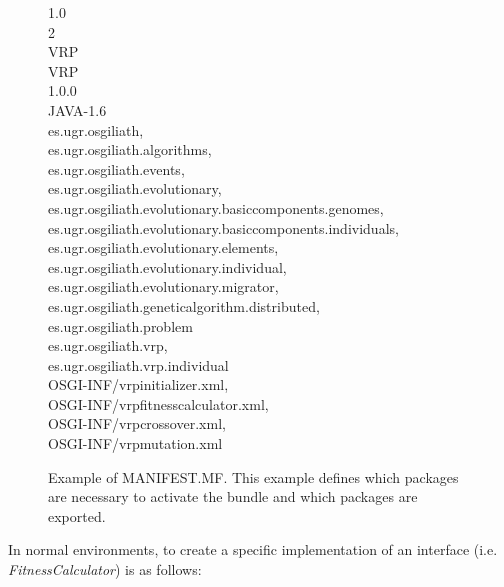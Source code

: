 \documentclass{sig-alternate}
\begin{document}
\begin{figure}[t]
\noindent
\ttfamily
{} 1.0\\
 2\\
 VRP\\
 VRP\\
 1.0.0\\
 JAVA-1.6\\
  es.ugr.osgiliath,\\
 \hlstd{}  es.ugr.osgiliath.algorithms,\\
\hlstd{} es.ugr.osgiliath.events,\\
 \hlstd{}es.ugr.osgiliath.evolutionary,\\
 \hlstd{}es.ugr.osgiliath.evolutionary.basiccomponents.genomes,\\
 \hlstd{}es.ugr.osgiliath.evolutionary.basiccomponents.individuals,\\
 \hlstd{}es.ugr.osgiliath.evolutionary.elements,\\
 \hlstd{}es.ugr.osgiliath.evolutionary.individual,\\
 \hlstd{}es.ugr.osgiliath.evolutionary.migrator,\\
 \hlstd{}es.ugr.osgiliath.geneticalgorithm.distributed,\\
 \hlstd{}es.ugr.osgiliath.problem\\
 es.ugr.osgiliath.vrp,\\
 \hlstd{}es.ugr.osgiliath.vrp.individual\\
\hlstd{} OSGI-INF/vrpinitializer.xml,\\
OSGI-INF/vrpfitnesscalculator.xml,\\
 OSGI-INF/vrpcrossover.xml,\\
 OSGI-INF/vrpmutation.xml\\
\mbox{}
 
\normalfont
\caption{Example of MANIFEST.MF. This example defines which packages are necessary to activate the bundle and which packages are exported.}
\label{fig:manifest}
\end {figure}





In normal environments, to create a specific implementation of an interface (i.e. {\em FitnessCalculator}) is as follows:
\end{document}
